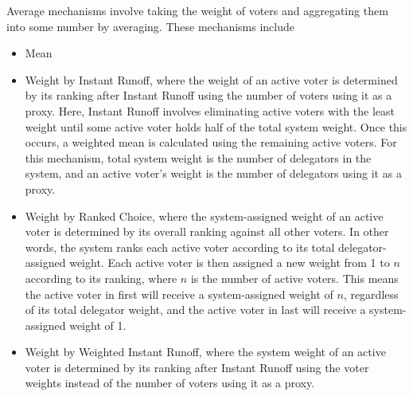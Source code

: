 Average mechanisms involve taking the weight of voters and aggregating them into some
number by averaging.
These mechanisms include
\begin{itemize}
    \item Mean
    \item {
        Weight by Instant Runoff, where the weight of an active voter is
        determined by its ranking after Instant Runoff using the number of voters
        using it as a proxy.
        Here, Instant Runoff involves eliminating active voters with the least weight
        until some active voter holds half of the total system weight.
        Once this occurs, a weighted mean is calculated using the remaining active
        voters.
        For this mechanism, total system weight is the number of delegators in the
        system, and an active voter's weight is the number of delegators using it as
        a proxy.
    }
    \item {
        Weight by Ranked Choice, where the system-assigned weight of an active voter is
        determined by its overall ranking against all other voters.
        In other words, the system ranks each active voter according to its total
        delegator-assigned weight.
        Each active voter is then assigned a new weight from 1 to $n$ according to its
        ranking, where $n$ is the number of active voters.
        This means the active voter in first will receive a system-assigned weight of
        $n$, regardless of its total delegator weight, and the active voter in last will
        receive a system-assigned weight of 1.
    }
    \item Weight by Weighted Instant Runoff, where the system weight of an active
    voter is determined by its ranking after Instant Runoff using the voter weights
    instead of the number of voters using it as a proxy.
\end{itemize}

